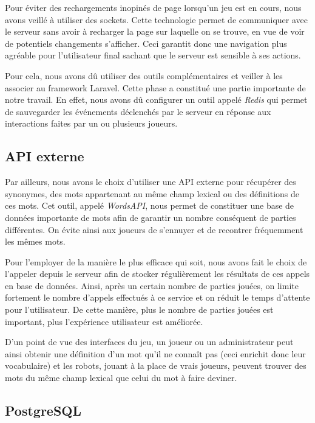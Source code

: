 \documentclass{tnreport}
\begin{document}
\label{chapter:back_end_sockets}

Pour éviter des rechargements inopinés de page lorsqu'un jeu est en cours, nous avons veillé à utiliser des sockets. Cette technologie permet de communiquer avec le serveur sans avoir à recharger la page sur laquelle on se trouve, en vue de voir de potentiels changements s'afficher. Ceci garantit donc une navigation plus agréable pour l'utilisateur final sachant que le serveur est sensible à ses actions. 

Pour cela, nous avons dû utiliser des outils complémentaires et veiller à les associer au framework Laravel. Cette phase a constitué une partie importante de notre travail. En effet, nous avons dû configurer un outil appelé \textit{Redis} qui permet de sauvegarder les événements déclenchés par le serveur en réponse aux interactions faites par un ou plusieurs joueurs.

\subsection{API externe}

Par ailleurs, nous avons le choix d'utiliser une API externe pour récupérer des synonymes, des mots appartenant au même champ lexical ou des définitions de ces mots. Cet outil, appelé \textit{WordsAPI}, nous permet de constituer une base de données importante de mots afin de garantir un nombre conséquent de parties différentes. On évite ainsi aux joueurs de s'ennuyer et de recontrer fréquemment les mêmes mots. 

Pour l'employer de la manière le plus efficace qui soit, nous avons fait le choix de l'appeler depuis le serveur afin de stocker régulièrement les résultats de ces appels en base de données. Ainsi, après un certain nombre de parties jouées, on limite fortement le nombre d'appels effectués à ce service et on réduit le temps d'attente pour l'utilisateur. De cette manière, plus le nombre de parties jouées est important, plus l'expérience utilisateur est améliorée.

D'un point de vue des interfaces du jeu, un joueur ou un administrateur peut ainsi obtenir une définition d'un mot qu'il ne connaît pas (ceci enrichit donc leur vocabulaire) et les robots, jouant à la place de vrais joueurs, peuvent trouver des mots du même champ lexical que celui du mot à faire deviner. 

\subsection{PostgreSQL}
\end{document}
